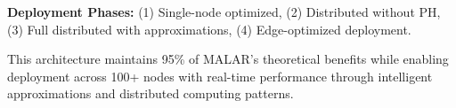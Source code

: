 \documentclass[11pt,english]{article}
\theoremstyle{remark}
\begin{document}
	\noindent
	\textbf{Deployment Phases:} (1) Single-node optimized, (2) Distributed without PH, (3) Full distributed with approximations, (4) Edge-optimized deployment.
	
	\vspace{0.1in}
	\noindent
	This architecture maintains 95\% of MALAR's theoretical benefits while enabling deployment across 100+ nodes with real-time performance through intelligent approximations and distributed computing patterns.
\end{document}
